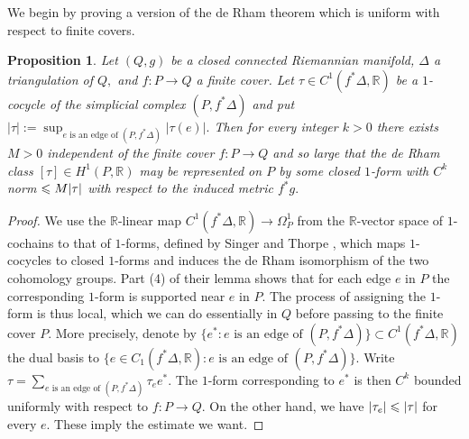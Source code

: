 \documentclass{article}
\theoremstyle{plain}%
\newtheorem{prop}[thm]{Proposition}
\theoremstyle{definition}
\numberwithin{equation}{section}
\numberwithin{figure}{section}
\def\l{\label}
\def\le{\leqslant\nobreak}
\def\R{{\mathbin{\mathbb R}}}
\def\ta{\tau}
\def\De{\Delta}
\def\Om{\Omega}
\begin{document}
We begin by proving a version of the de Rham theorem which is uniform with respect to finite covers.
\begin{prop}\l{prop: de Rham}
Let $(Q,g)$ be a closed connected Riemannian manifold, $\De$ a triangulation of $Q,$ and $f:P\to Q$ a finite cover. Let $\ta\in C^1(f^*\De,\R)$ be a $1$-cocycle of the simplicial complex $(P,f^*\De)$ and put $|\ta|:=\sup_{e\text{ is an edge of }(P,f^*\De)}|\ta(e)|.$ Then for every integer $k>0$ there exists $M>0$ independent of the finite cover $f:P\to Q$ and so large that the de Rham class $[\ta]\in H^1(P,\R)$ may be represented on $P$ by some closed $1$-form with $C^k$ norm $\le M|\ta|$ with respect to the induced metric $f^*g.$ 
\end{prop}
\begin{proof}
We use the $\R$-linear map $C^1(f^*\De,\R)\to \Om^1_P$ from the $\R$-vector space of $1$-cochains to that of $1$-forms, defined by Singer and Thorpe \cite[\S6.2, Lemma 1]{ST}, which maps $1$-cocycles to closed $1$-forms and induces the de Rham isomorphism of the two cohomology groups.
Part (4) of their lemma shows that for each edge $e$ in $P$ the corresponding $1$-form is supported near $e$ in $P.$
The process of assigning the $1$-form is thus local, which we can do essentially in $Q$ before passing to the finite cover $P.$ More precisely, denote by $\{e^*:e\text{ is an edge of }(P,f^*\De)\}\subset C^1(f^*\De,\R)$ the dual basis to $\{e\in C_1(f^*\De,\R):e\text{ is an edge of }(P,f^*\De)\}.$ Write $\ta=\sum_{e\text{ is an edge of }(P,f^*\De)}\ta_e e^*.$ The $1$-form corresponding to $e^*$ is then $C^k$ bounded uniformly with respect to $f:P\to Q.$ On the other hand, we have $|\ta_e|\le |\ta|$ for every $e.$ These imply the estimate we want.
\end{proof}
\end{document}
